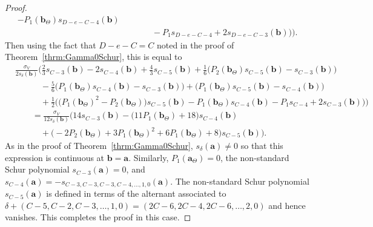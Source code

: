 \documentclass{amsart}
\theoremstyle{definition}
\theoremstyle{remark}
\newcommand{\bs}{\boldsymbol}
\begin{document}
\begin{proof}
\begin{align*}
                - P_1(\bs{b}_\Theta) s_{D - e - C - 4}(\bs{b})
    \\&\quad\quad\quad
                - P_1 s_{D - e - C - 4} + 2 s_{D - e - C - 3}(\bs{b})
    \Big) \Big).
\end{align*}
Then using the fact that $D-e-C = C$ noted in the proof of Theorem~\ref{thrm:Gamma0Schur},
this is equal to
\begin{align*}
    &\frac{\sigma_V}{ 2 s_{\delta}(\bs{b}) }\Big(
    \frac{2}{3} s_{C - 3}(\bs{b})
            - 2 s_{C - 4}(\bs{b})
            + \frac{4}{3} s_{C - 5}(\bs{b})
            + \frac{1}{6}\big(P_2(\bs{b}_\Theta) s_{C - 5}(\bs{b})
                - s_{C - 3}(\bs{b}) \big)
    \\&\quad\quad\quad
            - \frac{5}{6}\big(P_1(\bs{b}_\Theta) s_{C - 4}(\bs{b})
                - s_{C - 3}(\bs{b}) \big)
            + \big(P_1(\bs{b}_\Theta) s_{C - 5}(\bs{b})
                - s_{C - 4}(\bs{b}) \big)
    \\&\quad\quad\quad
            + \frac{1}{2}\Big( \big(P_1(\bs{b}_\Theta)^2 - P_2 (\bs{b}_\Theta) \big)
                s_{C - 5}(\bs{b})
                - P_1(\bs{b}_\Theta) s_{C - 4}(\bs{b})
                - P_1 s_{C - 4} + 2 s_{C - 3}(\bs{b})
    \Big)\Big)
    \\&\quad\quad=
    \frac{\sigma_V}{12 s_{\delta}(\bs{b}) }\Big(
        14 s_{C - 3}(\bs{b})
        - \big( 11 P_1(\bs{b}_\Theta) + 18 \big) s_{C - 4}(\bs{b})
    \\&\quad\quad\quad
        + \big( -2 P_2(\bs{b}_\Theta) + 3 P_1(\bs{b}_\Theta)^2 + 6 P_1(\bs{b}_\Theta) + 8 \big)
            s_{C - 5}(\bs{b}) \Big).
\end{align*}
As in the proof of Theorem~\ref{thrm:Gamma0Schur}, $s_{\delta}(\bs{a}) \neq 0$ so that this expression
is continuous at $\bs{b} = \bs{a}$. Similarly, $P_1(\bs{a}_\Theta) = 0$, the non-standard Schur polynomial
$s_{C - 3}(\bs{a}) = 0$, and $s_{C-4}(\bs{a}) = - s_{C-3,C-3,C-3,C-4,\ldots,1,0}(\bs{a})$.
The non-standard Schur polynomial $s_{C - 5}(\bs{a})$ is defined in terms of the alternant associated to
$\delta+(C-5,C-2,C-3,\ldots,1,0) = (2C-6,2C-4,2C-6,\ldots,2,0)$ and hence vanishes.
This completes the proof in this case.


\end{proof}
\end{document}
